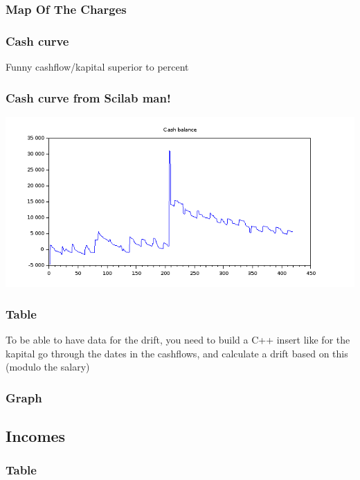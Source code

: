 \documentclass[8pt]{article} %
\begin{document}
\subsubsection{Map Of The Charges}
%


\subsubsection{Cash curve}
Funny cashflow/kapital superior to percent\\


\subsubsection{Cash curve from Scilab man!}
\includegraphics[scale=0.6]{Scilab-cashBalance.png}

\subsubsection{Table}

To be able to have data for the drift, you need to build a C++ insert like for the kapital
go through the dates in the cashflows, and calculate a drift based on this (modulo the salary) 
\subsubsection{Graph}
%
%

\subsection{Incomes}
%

\subsubsection{Table}

\end{document}
